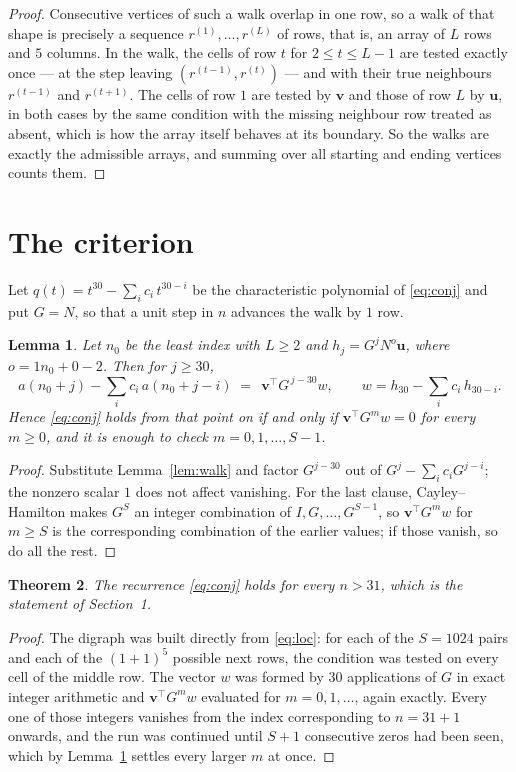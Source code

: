 \documentclass[11pt,a4paper]{article}
\theoremstyle{plain}
\newtheorem{theorem}{Theorem}
\newtheorem{lemma}[theorem]{Lemma}
\theoremstyle{definition}
\begin{document}
\begin{proof}
Consecutive vertices of such a walk overlap in one row, so a walk of that shape is
precisely a sequence $r^{(1)},\dots,r^{(L)}$ of rows, that is, an array of $L$ rows
and $5$ columns. In the walk, the cells of row $t$ for $2\le t\le L-1$ are tested
exactly once --- at the step leaving $(r^{(t-1)},r^{(t)})$ --- and with their true
neighbours $r^{(t-1)}$ and $r^{(t+1)}$. The cells of row $1$ are tested by
$\mathbf{v}$ and those of row $L$ by $\mathbf{u}$, in both cases by the same condition
with the missing neighbour row treated as absent, which is how the array itself behaves at
its boundary. So the walks are exactly the admissible arrays, and summing over all starting
and ending vertices counts them.
\end{proof}

\section{The criterion}

Let $q(t)=t^{30}-\sum_i c_i\,t^{30-i}$ be the characteristic polynomial of
\eqref{eq:conj} and put $G=N$, so that a unit step in $n$ advances the walk by
$1$ row.

\begin{lemma}\label{lem:crit}
Let $n_0$ be the least index with $L\ge2$ and $h_j=G^{j}N^{o}\mathbf{u}$, where
$o=1n_0+0-2$. Then for $j\ge30$,
\[
a(n_0+j)-\sum_i c_i\,a(n_0+j-i)\;=\;\,\mathbf{v}^{\!\top}G^{\,j-30}w,
\qquad w=h_{30}-\sum_i c_i\,h_{30-i} .
\]
Hence \eqref{eq:conj} holds from that point on if and only if
$\mathbf{v}^{\!\top}G^{m}w=0$ for every $m\ge0$, and it is enough to check
$m=0,1,\dots,S-1$.
\end{lemma}

\begin{proof}
Substitute Lemma~\ref{lem:walk} and factor $G^{j-30}$ out of
$G^{j}-\sum_ic_iG^{j-i}$; the nonzero scalar $1$ does not affect
vanishing. For the last clause, Cayley--Hamilton makes $G^{S}$ an integer combination of
$I,G,\dots,G^{S-1}$, so $\mathbf{v}^{\!\top}G^{m}w$ for $m\ge S$ is the corresponding
combination of the earlier values; if those vanish, so do all the rest.
\end{proof}

\begin{theorem}
The recurrence \eqref{eq:conj} holds for every $n>31$, which is the statement of
Section~1.
\end{theorem}

\begin{proof}
The digraph was built directly from \eqref{eq:loc}: for each of the $S=1024$ pairs and each
of the $(1+1)^{5}$ possible next rows, the condition was tested on every cell of
the middle row. The vector $w$ was formed by $30$ applications of $G$ in exact integer
arithmetic and $\mathbf{v}^{\!\top}G^{m}w$ evaluated for $m=0,1,\dots$, again exactly.
Every one of those integers vanishes from the index corresponding to $n=31+1$ onwards,
and the run was continued until $S+1$ consecutive zeros had been seen, which by
Lemma~\ref{lem:crit} settles every larger $m$ at once.
\end{proof}
\end{document}
